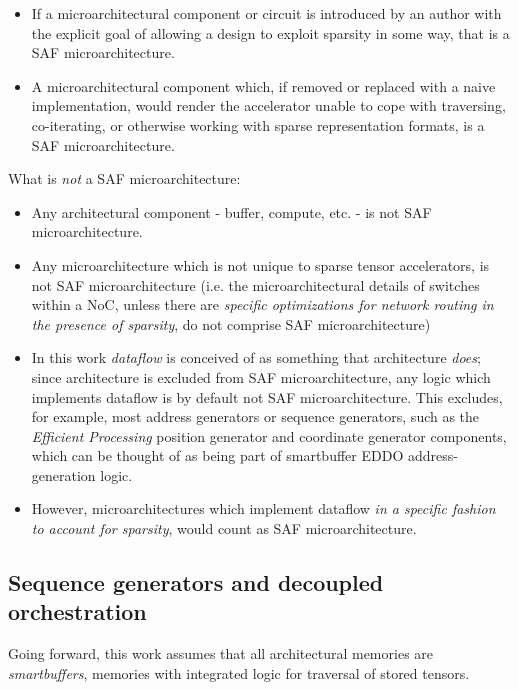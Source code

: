 \begin{itemize}
    \item If a microarchitectural component or circuit is introduced by an author with the explicit goal of allowing a design to exploit sparsity in some way, that is a SAF microarchitecture.
    \item A microarchitectural component which, if removed or replaced with a naive implementation, would render the accelerator unable to cope with traversing, co-iterating, or otherwise working with sparse representation formats, is a SAF microarchitecture.
\end{itemize}

What is \textit{not} a SAF microarchitecture:

\begin{itemize}
    \item Any architectural component - buffer, compute, etc. - is not SAF microarchitecture.
    \item Any microarchitecture which is not unique to sparse tensor accelerators, is not SAF microarchitecture (i.e. the microarchitectural details of switches within a NoC, unless there are \textit{specific optimizations for network routing in the presence of sparsity}, do not comprise SAF microarchitecture)
    \item In this work \textit{dataflow} is conceived of as something that architecture \textit{does}; since architecture is excluded from SAF microarchitecture, any logic which implements dataflow is by default not SAF microarchitecture. This excludes, for example, most address generators or sequence generators, such as the \textit{Efficient Processing} position generator and coordinate generator components, which can be thought of as being part of smartbuffer\cite{smartbuffer} EDDO address-generation logic. 
    \item However, microarchitectures which implement dataflow \textit{in a specific fashion to account for sparsity}, would count as SAF microarchitecture.
\end{itemize}

\subsection{Sequence generators and decoupled orchestration}

Going forward, this work assumes that all architectural memories are \textit{smartbuffers}\cite{smartbuffer}, memories with integrated logic for traversal of stored tensors.

